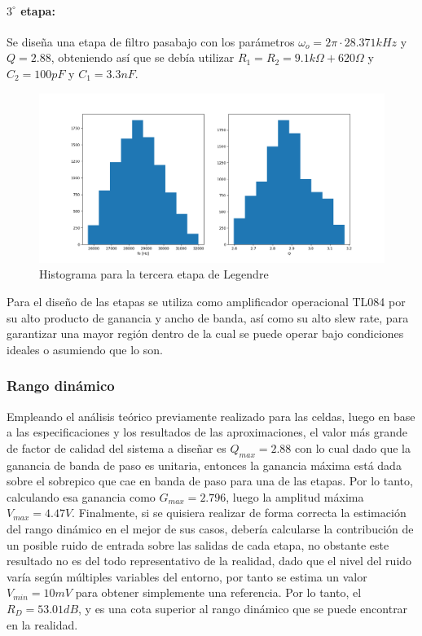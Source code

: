 \paragraph{$3^{\circ}$ etapa:} Se dise\~na una etapa de filtro pasabajo con los par\'ametros $\omega_o = 2 \pi \cdot 28.371kHz$ y $Q = 2.88$, obteniendo as\'i que se deb\'ia utilizar $R_1 = R_2 = 9.1k\Omega + 620 \Omega$ y $C_2 = 100pF$ y $C_1 = 3.3nF$.

\begin{figure}[H]
    \centering
    \includegraphics[scale=0.4]{../EJ1/Recursos/legendre_histogram_three.png}
    \caption{Histograma para la tercera etapa de Legendre}
    \label{fig:legendre_histogram_three}
\end{figure}

Para el dise\~no de las etapas se utiliza como amplificador operacional TL084 por su alto producto de ganancia y ancho de banda, as\'i como su alto slew rate, para garantizar una mayor regi\'on dentro de la cual se puede operar bajo condiciones ideales o asumiendo que lo son.

\subsubsection{Rango din\'amico}
Empleando el an\'alisis te\'orico previamente realizado para las celdas, luego en base a las especificaciones y los resultados de las aproximaciones, el valor m\'as grande de factor de calidad del sistema a dise\~nar
es $Q_{max} = 2.88$ con lo cual dado que la ganancia de banda de paso es unitaria, entonces la ganancia m\'axima est\'a dada sobre el sobrepico que cae en banda de paso para una de las etapas. Por lo tanto,
calculando esa ganancia como $G_{max} = 2.796$, luego la amplitud m\'axima $V_{max} = 4.47V$. Finalmente, si se quisiera realizar de forma correcta la estimaci\'on del rango din\'amico en el mejor de sus casos,
deber\'ia calcularse la contribuci\'on de un posible ruido de entrada sobre las salidas de cada etapa, no obstante este resultado no es del todo representativo de la realidad, dado que el nivel del ruido var\'ia
seg\'un m\'ultiples variables del entorno, por tanto se estima un valor $V_{min} = 10mV$ para obtener simplemente una referencia. Por lo tanto, el $R_D = 53.01dB$, y es una cota superior al rango din\'amico que se
puede encontrar en la realidad.

